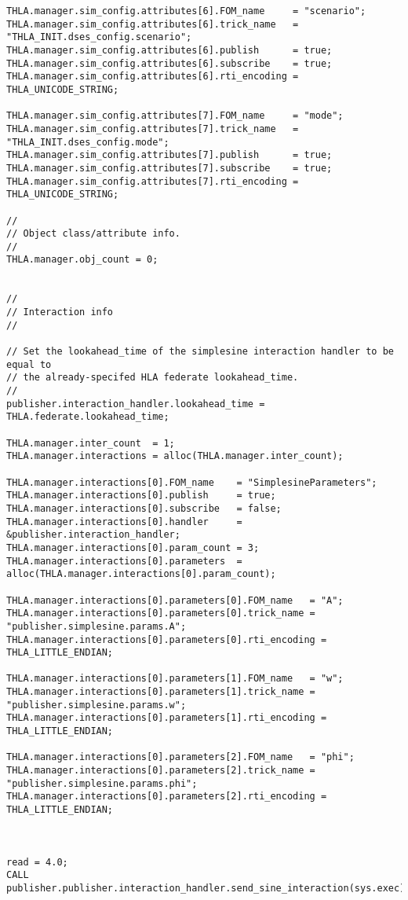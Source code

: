 \begin{lstlisting}[caption={{\tt SIM\_simplesine\_hla\_sendInt} input file},label={list:complete-sender-input}]
THLA.manager.sim_config.attributes[6].FOM_name     = "scenario";
THLA.manager.sim_config.attributes[6].trick_name   = "THLA_INIT.dses_config.scenario";
THLA.manager.sim_config.attributes[6].publish      = true;
THLA.manager.sim_config.attributes[6].subscribe    = true;
THLA.manager.sim_config.attributes[6].rti_encoding = THLA_UNICODE_STRING;

THLA.manager.sim_config.attributes[7].FOM_name     = "mode";
THLA.manager.sim_config.attributes[7].trick_name   = "THLA_INIT.dses_config.mode";
THLA.manager.sim_config.attributes[7].publish      = true;
THLA.manager.sim_config.attributes[7].subscribe    = true;
THLA.manager.sim_config.attributes[7].rti_encoding = THLA_UNICODE_STRING;

//
// Object class/attribute info.
//
THLA.manager.obj_count = 0;

 
//
// Interaction info
//

// Set the lookahead_time of the simplesine interaction handler to be equal to
// the already-specifed HLA federate lookahead_time.
//
publisher.interaction_handler.lookahead_time = THLA.federate.lookahead_time;

THLA.manager.inter_count  = 1;
THLA.manager.interactions = alloc(THLA.manager.inter_count);

THLA.manager.interactions[0].FOM_name    = "SimplesineParameters";
THLA.manager.interactions[0].publish     = true;
THLA.manager.interactions[0].subscribe   = false;
THLA.manager.interactions[0].handler     = &publisher.interaction_handler;
THLA.manager.interactions[0].param_count = 3;
THLA.manager.interactions[0].parameters  = alloc(THLA.manager.interactions[0].param_count);

THLA.manager.interactions[0].parameters[0].FOM_name   = "A";
THLA.manager.interactions[0].parameters[0].trick_name = "publisher.simplesine.params.A";
THLA.manager.interactions[0].parameters[0].rti_encoding = THLA_LITTLE_ENDIAN;

THLA.manager.interactions[0].parameters[1].FOM_name   = "w";
THLA.manager.interactions[0].parameters[1].trick_name = "publisher.simplesine.params.w";
THLA.manager.interactions[0].parameters[1].rti_encoding = THLA_LITTLE_ENDIAN;

THLA.manager.interactions[0].parameters[2].FOM_name   = "phi";
THLA.manager.interactions[0].parameters[2].trick_name = "publisher.simplesine.params.phi";
THLA.manager.interactions[0].parameters[2].rti_encoding = THLA_LITTLE_ENDIAN;



read = 4.0;
CALL publisher.publisher.interaction_handler.send_sine_interaction(sys.exec);
\end{lstlisting}

